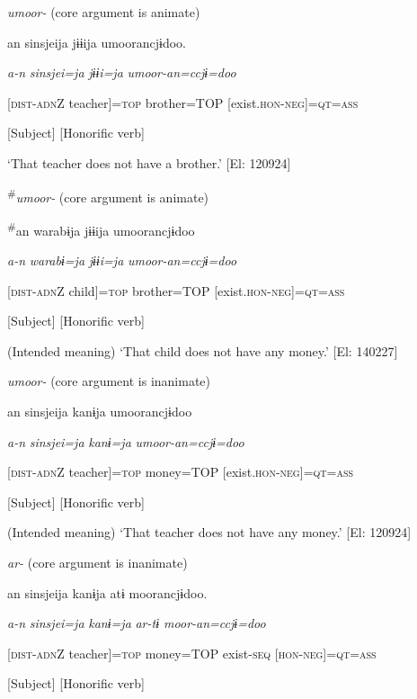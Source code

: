 \textbf{\ea\label{ex:8-35}
}\ea \textit{umoor-} (core argument is animate)

    {\TM}
\glll  an  sinsjeija  jɨɨija  umoorancjɨdoo.

      \textit{a-n}  \textit{sinsjei=ja}  \textit{jɨɨi=ja}  \textit{umoor{}-an=ccjɨ=doo}

      [\textsc{dist}-\textsc{adn}Z  teacher]=\textsc{top}  brother=TOP  [exist.\textsc{hon}-\textsc{neg}]=\textsc{qt}=\textsc{ass}

      [Subject]      [Honorific verb]

\glt ‘That teacher does not have a brother.’ [El: 120924]

\ex \textsuperscript{\#}\textit{umoor-} (core argument is animate)

    {\TM}
\glll  \textsuperscript{\#}an  warabɨja  jɨɨija  umoorancjɨdoo

      \textit{a-n}  \textit{warabɨ=ja}  \textit{jɨɨi=ja}  \textit{umoor{}-an=ccjɨ=doo}

      [\textsc{dist}-\textsc{adn}Z  child]=\textsc{top}  brother=TOP  [exist.\textsc{hon}-\textsc{neg}]=\textsc{qt}=\textsc{ass}

      [Subject]      [Honorific verb]

      (Intended meaning) ‘That child does not have any money.’ [El: 140227]

\ex *\textit{umoor-} (core argument is inanimate)

    {\TM}
\glll  *an  sinsjeija  kanɨja  umoorancjɨdoo

      \textit{a-n}  \textit{sinsjei=ja}  \textit{kanɨ=ja}  \textit{umoor{}-an=ccjɨ=doo}

      [\textsc{dist}-\textsc{adn}Z  teacher]=\textsc{top}  money=TOP  [exist.\textsc{hon}-\textsc{neg}]=\textsc{qt}=\textsc{ass}

      [Subject]      [Honorific verb]

      (Intended meaning) ‘That teacher does not have any money.’ [El: 120924]

\ex \textit{ar-} (core argument is inanimate)

    {\TM}
\glll  an  sinsjeija  kanɨja  atɨ  moorancjɨdoo.

      \textit{a-n}  \textit{sinsjei=ja}  \textit{kanɨ=ja}  \textit{ar{}-tɨ  moor-an=ccjɨ=doo}

      [\textsc{dist}-\textsc{adn}Z  teacher]=\textsc{top}  money=TOP  exist-\textsc{seq}  [\textsc{hon}-\textsc{neg}]=\textsc{qt}=\textsc{ass}

      [Subject]        [Honorific verb]

